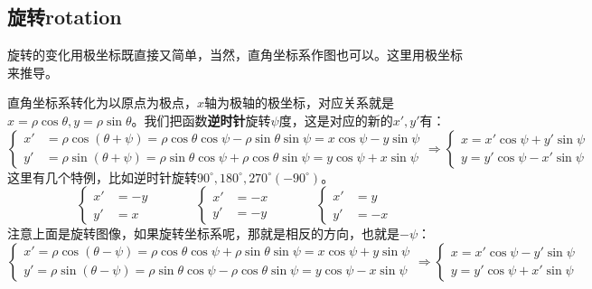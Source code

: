 \documentclass[../main.tex]{subfiles}
\begin{document}
\subsection{旋转rotation}
旋转的变化用极坐标既直接又简单，当然，直角坐标系作图也可以。这里用极坐标来推导。

直角坐标系转化为以原点为极点，$x$轴为极轴的极坐标，对应关系就是$x=\rho \cos \theta, y=\rho \sin \theta$。我们把函数\textbf{逆时针}旋转$\psi$度，这是对应的新的$x', y'$有：
{
 \setlength{\mathindent}{0em}
\[
  \left\{
    \begin{aligned}
      x'&=\rho \cos(\theta + \psi)=\rho \cos\theta\cos\psi-\rho \sin\theta\sin\psi=x\cos\psi-y\sin\psi\\
      y'&=\rho \sin(\theta + \psi)=\rho \sin\theta\cos\psi+\rho \cos\theta\sin\psi=y\cos\psi+x\sin\psi
    \end{aligned}
  \right.
  \Rightarrow
  \left\{
    \begin{aligned}
      x=x'\cos\psi + y'\sin\psi\\
      y=y'\cos\psi - x'\sin\psi
    \end{aligned}
  \right.
\]
}
这里有几个特例，比如逆时针旋转$90^{\circ}, 180^{\circ}, 270^{\circ}(-90^{\circ})$。
{
 \setlength{\mathindent}{0em}
\[
  \left\{
    \begin{aligned}
      x'&=-y\\
      y'&=x
    \end{aligned}
  \right.
  \phantom{xxxxxx}
  \left\{
    \begin{aligned}
      x'&=-x\\
      y'&=-y
    \end{aligned}
  \right.
  \phantom{xxxxxx}
  \left\{
    \begin{aligned}
      x'&=y\\
      y'&=-x
    \end{aligned}
  \right.
\]
}
注意上面是旋转图像，如果旋转坐标系呢，那就是相反的方向，也就是$-\psi$：
{
 \setlength{\mathindent}{0em}
\[
  \left\{
    \begin{aligned}
      x'=\rho \cos(\theta - \psi)=\rho \cos\theta\cos\psi+\rho \sin\theta\sin\psi=x\cos\psi+y\sin\psi\\
      y'=\rho \sin(\theta - \psi)=\rho \sin\theta\cos\psi-\rho \cos\theta\sin\psi=y\cos\psi-x\sin\psi
    \end{aligned}
  \right.
  \Rightarrow
  \left\{
    \begin{aligned}
      x=x'\cos\psi - y'\sin\psi\\
      y=y'\cos\psi + x'\sin\psi
    \end{aligned}
  \right.
\]
}
\end{document}
